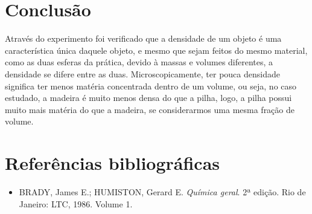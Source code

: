 \documentclass[12pt]{article}
\begin{document}
\vfill

\section{Conclusão}
Através do experimento foi verificado que a densidade de um objeto é uma característica única daquele objeto, e mesmo que sejam feitos do mesmo material, como as duas esferas da prática, devido à massas e volumes diferentes, a densidade se difere entre as duas. Microscopicamente, ter pouca densidade significa ter menos matéria concentrada dentro de um volume, ou seja, no caso estudado, a madeira é muito menos densa do que a pilha, logo, a pilha possui muito mais matéria do que a madeira, se considerarmos uma mesma fração de volume. 

\section{Referências bibliográficas}
\begin{itemize}
\item BRADY, James E.; HUMISTON, Gerard E. \textit{Química geral}. 2ª edição. Rio de Janeiro: LTC, 1986. Volume 1.
\end{itemize}
\end{document}
